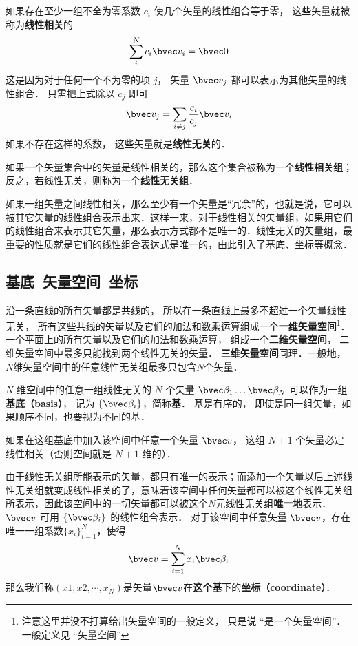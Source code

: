 如果存在至少一组不全为零系数 $c_i$ 使几个矢量的线性组合等于零， 这些矢量就被称为\textbf{线性相关}的
\begin{equation}\label{GVec_eq2}
\sum_i^N c_i \bvec v_i = \bvec 0
\end{equation}
这是因为对于任何一个不为零的项 $j$， 矢量 $\bvec v_j$ 都可以表示为其他矢量的线性组合． 只需把上式除以 $c_j$ 即可
\begin{equation}\label{GVec_eq3}
\bvec v_j = \sum_{i \ne j}\frac{c_i}{c_j} \bvec v_i
\end{equation}
如果不存在这样的系数， 这些矢量就是\textbf{线性无关}的． 

如果一个矢量集合中的矢量是线性相关的，那么这个集合被称为一个\textbf{线性相关组}；反之，若线性无关，则称为一个\textbf{线性无关组}．

如果一组矢量之间线性相关，那么至少有一个矢量是“冗余”的，也就是说，它可以被其它矢量的线性组合表示出来．这样一来，对于线性相关的矢量组，如果用它们的线性组合来表示其它矢量，那么表示方式都不是唯一的．线性无关的矢量组，最重要的性质就是它们的线性组合表达式是唯一的，由此引入了基底、坐标等概念．

\subsection{基底\ 矢量空间\ 坐标}
沿一条直线的所有矢量都是共线的， 所以在一条直线上最多不超过一个矢量线性无关， 所有这些共线的矢量以及它们的加法和数乘运算组成一个\textbf{一维矢量空间}\footnote{注意这里并没不打算给出矢量空间的一般定义， 只是说 “是一个矢量空间”． 一般定义见 “矢量空间”}． 一个平面上的所有矢量以及它们的加法和数乘运算， 组成一个\textbf{二维矢量空间}， 二维矢量空间中最多只能找到两个线性无关的矢量． \textbf{三维矢量空间}同理．一般地，$N$维矢量空间中的任意线性无关组最多只包含$N$个矢量．

$N$ 维空间中的任意一组线性无关的 $N$ 个矢量 $\bvec \beta_1\dots \bvec \beta_N$ 可以作为一组\textbf{基底（basis）}， 记为 $\{\bvec \beta_i\}$，简称\textbf{基}． 基是有序的， 即使是同一组矢量，如果顺序不同，也要视为不同的基． 

如果在这组基底中加入该空间中任意一个矢量 $\bvec v$， 这组 $N+1$ 个矢量必定线性相关（否则空间就是 $N+1$ 维的）．

由于线性无关组所能表示的矢量，都只有唯一的表示；而添加一个矢量以后上述线性无关组就变成线性相关的了，意味着该空间中任何矢量都可以被这个线性无关组所表示，因此该空间中的一切矢量都可以被这个$N$元线性无关组\textbf{唯一地}表示．$\bvec v$ 可用 $\{\bvec \beta_i\}$ 的线性组合表示． 对于该空间中任意矢量 $\bvec v$，存在唯一一组系数$\{x_i\}_{i=1}^N$，使得
\begin{equation}\label{GVec_eq5}
\bvec v = \sum_{i=1}^N x_i \bvec \beta_i
\end{equation}
那么我们称$(x1, x2, \cdots, x_N)$是矢量$\bvec v$在\textbf{这个基}下的\textbf{坐标（coordinate）}．

